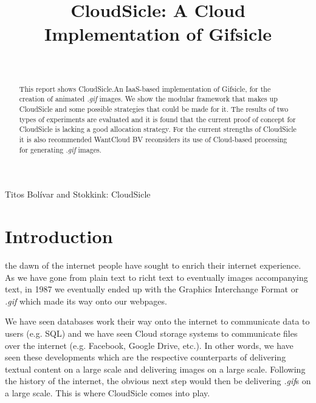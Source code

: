 \documentclass[twocolumn,twoside]{IEEEtran}
\begin{document}
\title{CloudSicle: A Cloud Implementation of Gifsicle}

\author{
\phantom{Hello :D}
\\
}

{Titos Bol\'{i}var and Stokkink: CloudSicle}

\maketitle

\begin{abstract}
This report shows CloudSicle.An IaaS-based implementation of Gifsicle,
for the creation of animated \emph{.gif} images. We show
the modular framework that makes up CloudSicle and some possible
strategies that could be made for it. The results of
two types of experiments are evaluated and it is found that the
current proof of concept for CloudSicle is lacking a good allocation
strategy. For the current strengths of CloudSicle it is also recommended
WantCloud BV reconsiders its use of Cloud-based processing for
generating \emph{.gif} images.
\end{abstract}

\section{Introduction}
\label{sec:intro}
 the dawn of the internet people have sought to 
enrich their internet experience. As we have gone from plain 
text to richt text to eventually images accompanying text, in 1987 we 
eventually ended up with the Graphics Interchange Format or \textit{.gif} which
made its way onto our webpages.

We have seen databases work their way onto the internet to communicate
data to users (e.g. SQL) and we have seen Cloud storage systems to communicate files
over the internet (e.g. Facebook, Google Drive, etc.). In other words, we have seen
these developments which are the respective counterparts of delivering
textual content on a large scale and delivering images on a large scale.
Following the history of the internet, the obvious next step would then be
delivering \textit{.gif}s on a large scale. This is where CloudSicle comes into play.
\end{document}
